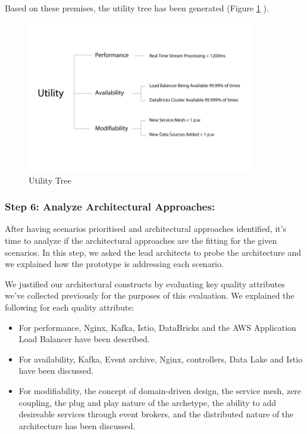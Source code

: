 \documentclass{bmcart}
\begin{document}
Based on these premises, the utility tree has been generated (Figure \ref{fig:utility-tree} ).

\begin{figure}[h!]
    \centering
    \includegraphics[width=10cm]{Media/Utility-tree.jpg}
    \caption{Utility Tree}
    \label{fig:utility-tree}
\end{figure}

\subsubsection{Step 6: Analyze Architectural Approaches:}

After having scenarios prioritised and architectural approaches identified, it's time to analyze if the architectural approaches are the fitting for the given scenarios. In this step, we asked the lead architects to probe the architecture and we explained how the prototype is addressing each scenario. 

We justified our architectural constructs by evaluating key quality attributes we've collected previously for the purposes of this evaluation. We explained the following for each quality attribute:

\begin{itemize}
    \item For performance, Nginx, Kafka, Istio, DataBricks and the AWS Application Load Balancer have been described.
    \item For availability, Kafka, Event archive, Nginx, controllers, Data Lake and Istio have been discussed.
    \item For modifiability, the concept of domain-driven design, the service mesh, zere coupling, the plug and play nature of the archetype, the ability to add desireable services through event brokers, and the distributed nature of the architecture has been discussed.
\end{itemize}
\end{document}
